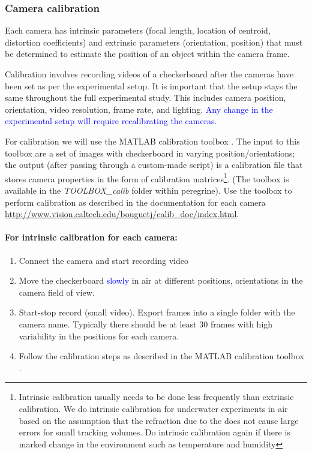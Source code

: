 \documentclass[11pt]{article}
\begin{document}
\subsubsection{Camera calibration}
Each camera has intrinsic parameters (focal length, location of centroid, distortion coefficients) and extrinsic parameters (orientation, position) that must be determined to estimate the position of an object within the camera frame.

Calibration involves recording videos of a checkerboard after the cameras have been set as per the experimental setup. It is important that the setup stays the same throughout the full experimental study. This includes camera position, orientation, video resolution, frame rate, and lighting. \textcolor{blue}{Any change in the experimental setup will require recalibrating the cameras.}

For calibration we will use the MATLAB calibration toolbox \cite{BouguetCalibrationToolbox}. The input to this toolbox are a set of images with checkerboard in varying position/orientations; the output (after passing through a custom-made script) is a calibration file that stores camera properties in the form of calibration matrices\footnote{Intrinsic calibration usually needs to be done less frequently than extrinsic calibration. We do intrinsic calibration for underwater experiments in air based on the assumption that the refraction due to the does not cause large errors for small tracking volumes. Do intrinsic calibration again if there is marked change in the environment such as temperature and humidity}. (The toolbox is available in the \emph{TOOLBOX\_calib} folder within peregrine). Use the toolbox to perform calibration as described in the documentation for each camera \url{http://www.vision.caltech.edu/bouguetj/calib_doc/index.html}.

\paragraph{For intrinsic calibration for each camera:}
\begin{enumerate}
\item Connect the camera and start recording video
\item Move the checkerboard \textcolor{blue}{slowly} in air at different positions, orientations in the camera field of view.
\item Start-stop record (small video). Export frames into a single folder with the camera name. Typically there should be at least 30 frames with high variability in the positions for each camera.
\item Follow the calibration steps as described in the MATLAB calibration toolbox \cite{BouguetCalibrationToolbox}.
\end{enumerate}
\end{document}
